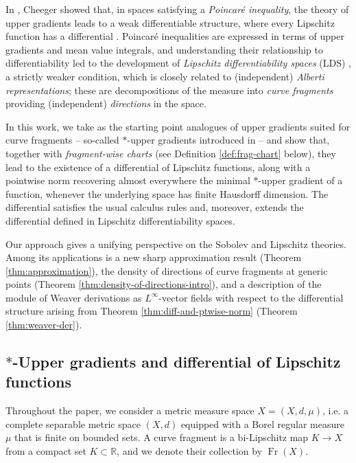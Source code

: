 \documentclass{amsart}
\numberwithin{equation}{section}
\newcommand{\R}{\mathbb{R}}
\newcommand{\Fr}{\operatorname{Fr}}
\begin{document}
In \cite{che99}, Cheeger showed that, in spaces satisfying a \emph{Poincar\'e inequality}, the theory of upper gradients leads to a weak differentiable structure, where every Lipschitz function has a differential \cite{che99,kei02,keith04}. Poincar\'e inequalities are expressed in terms of upper gradients and mean value integrals, and understanding their relationship to differentiability led to the development of \emph{Lipschitz differentiability spaces} (LDS) \cite{bate15}, a strictly weaker condition, which is closely related to (independent) \emph{Alberti representations}; these are decompositions of the measure into \emph{curve fragments} providing (independent) \emph{directions} in the space.

\medskip\noindent In this work, we take as the starting point analogues of upper gradients suited for curve fragments -- so-called $\ast$-upper gradients introduced in \cite{bate18} -- and show that, together with \emph{fragment-wise charts} (see Definition \ref{def:frag-chart} below), they lead to the existence of a differential of Lipschitz functions, along with a pointwise norm recovering almost everywhere the minimal $\ast$-upper gradient of a function, whenever the underlying space has finite Hausdorff dimension. The differential satisfies the usual calculus rules and, moreover, extends the differential defined in Lipschitz differentiability spaces. 

Our approach gives a unifying perspective on the Sobolev and Lipschitz theories. Among its applications is a new sharp approximation result (Theorem \ref{thm:approximation}), the density of directions of curve fragments at generic points (Theorem \ref{thm:density-of-directions-intro}), and a description of the module of Weaver derivations as $L^\infty$-vector fields with respect to the differential structure arising from Theorem \ref{thm:diff-and-ptwise-norm} (Theorem \ref{thm:weaver-der}).

\subsection{$\ast$-Upper gradients and differential of Lipschitz functions}
Throughout the paper, we consider a metric measure space $X=(X,d,\mu)$, i.e. a complete separable metric space $(X,d)$ equipped with a Borel regular measure $\mu$ that is finite on bounded sets. A curve fragment is a bi-Lipschitz map $K\to X$ from a compact set $K\subset \R$, and we denote their collection by $\Fr(X)$.
\end{document}
